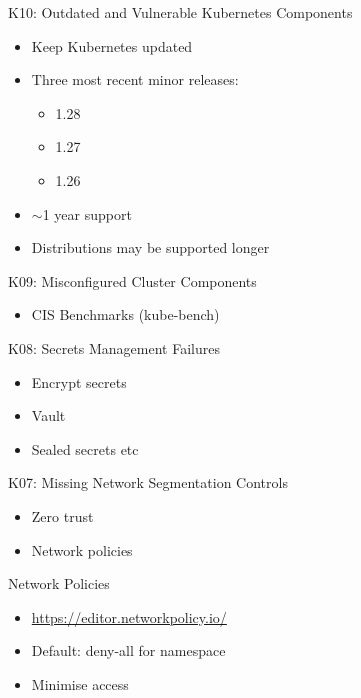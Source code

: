 \documentclass{dcpresentation}
\begin{document}
\begin{frame}{K10: Outdated and Vulnerable Kubernetes Components}
  \begin{itemize}
  \item Keep Kubernetes updated
  \item Three most recent minor releases:
    \begin{itemize}
    \item 1.28
    \item 1.27
    \item 1.26
    \end{itemize}
  \item $\sim$1 year support
  \item Distributions may be supported longer
  \end{itemize}
\end{frame}

\begin{frame}{K09: Misconfigured Cluster Components}
  \begin{itemize}
  \item CIS Benchmarks (kube-bench)
  \end{itemize}
\end{frame}

\begin{frame}{K08: Secrets Management Failures}
  \begin{itemize}
  \item Encrypt secrets
  \item Vault
  \item Sealed secrets etc
  \end{itemize}
\end{frame}


\begin{frame}{K07: Missing Network Segmentation Controls}
  \begin{itemize}
  \item Zero trust 
  \item Network policies
  \end{itemize}
\end{frame}

\begin{frame}{Network Policies}
  \begin{itemize}
  \item \url{https://editor.networkpolicy.io/}
  \item Default: deny-all for namespace
  \item Minimise access
  \end{itemize}
  
\end{frame}
\end{document}
